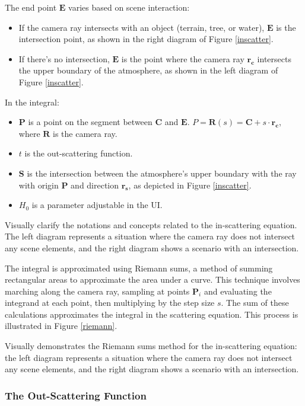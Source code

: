 The end point $\mathbf{E}$ varies based on scene interaction:
\begin{itemize}
    \item If the camera ray intersects with an object (terrain, tree, or water), $\mathbf{E}$ is the intersection point, as shown in the right diagram of Figure \ref{inscatter}.
    \item If there's no intersection, $\mathbf{E}$ is the point where the camera ray $\mathbf{r_c}$ intersects the upper boundary of the atmosphere, as shown in the left diagram of Figure \ref{inscatter}.
\end{itemize}

In the integral:
\begin{itemize}
    \item $\mathbf{P}$ is a point on the segment between $\mathbf{C}$ and $\mathbf{E}$. $P = \mathbf{R}(s) = \mathbf{C} + s \cdot \mathbf{r_c}$, where $\mathbf{R}$ is the camera ray.
    \item $t$ is the out-scattering function.
    \item $\mathbf{S}$ is the intersection between the atmosphere's upper boundary with the ray with origin $\mathbf{P}$ and direction $\mathbf{r_s}$, as depicted in Figure \ref{inscatter}.
    \item $H_0$ is a parameter adjustable in the UI.
\end{itemize}

{Visually clarify the notations and concepts related to the in-scattering equation. The left diagram represents a situation where the camera ray does not intersect any scene elements, and the right diagram shows a scenario with an intersection.}

The integral is approximated using Riemann sums, a method of summing rectangular areas to approximate the area under a curve. This technique involves marching along the camera ray, sampling at points $\mathbf{P}_i$ and evaluating the integrand at each point, then multiplying by the step size $s$. The sum of these calculations approximates the integral in the scattering equation. This process is illustrated in Figure \ref{riemann}.

{Visually demonstrates the Riemann sums method for the in-scattering equation: the left diagram represents a situation where the camera ray does not intersect any scene elements, and the right diagram shows a scenario with an intersection.}

\subsubsection{The Out-Scattering Function}


